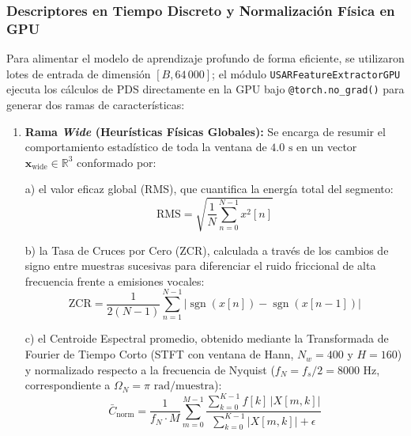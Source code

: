 \documentclass[11pt, a4paper]{article}
\begin{document}
\subsubsection{Descriptores en Tiempo Discreto y Normalización Física en GPU}
Para alimentar el modelo de aprendizaje profundo de forma eficiente, se utilizaron lotes de entrada de dimensión $[B, 64\,000]$; el módulo \texttt{USARFeatureExtractorGPU} ejecuta los cálculos de PDS directamente en la GPU bajo \texttt{@torch.no\_grad()} para generar dos ramas de características:

\begin{enumerate}
    \item[1)] \textbf{Rama \textit{Wide} (Heurísticas Físicas Globales):} Se encarga de resumir el comportamiento estadístico de toda la ventana de $4.0\text{ s}$ en un vector $\mathbf{x}_{\text{wide}} \in \mathbb{R}^3$ conformado por: 
    
    a) el valor eficaz global (RMS), que cuantifica la energía total del segmento:
    \begin{equation}
        \text{RMS} = \sqrt{\frac{1}{N}\sum_{n=0}^{N-1} x^2[n]} 
    \end{equation}

    b) la Tasa de Cruces por Cero (ZCR), calculada a través de los cambios de signo entre muestras sucesivas para diferenciar el ruido friccional de alta frecuencia frente a emisiones vocales:
    \begin{equation}
        \text{ZCR} = \frac{1}{2(N-1)} \sum_{n=1}^{N-1} |\operatorname{sgn}(x[n]) - \operatorname{sgn}(x[n-1])|
    \end{equation}

    c) el Centroide Espectral promedio, obtenido mediante la Transformada de Fourier de Tiempo Corto (STFT con ventana de Hann, $N_w = 400$ y $H = 160$) y normalizado respecto a la frecuencia de Nyquist ($f_N = f_s / 2 = 8000\text{ Hz}$, correspondiente a $\Omega_N = \pi\text{ rad/muestra}$):
    \begin{equation}
        \bar{C}_{\text{norm}} = \frac{1}{f_N \cdot M} \sum_{m=0}^{M-1} \frac{\sum_{k=0}^{K-1} f[k] \, |X[m, k]|}{\sum_{k=0}^{K-1} |X[m, k]| + \epsilon}
    \end{equation}


\end{enumerate}
\end{document}
